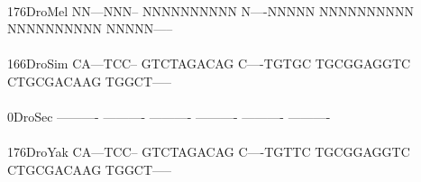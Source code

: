 \documentclass[11pt,twoside,reqno,a4paper]{article}
\begin{document}
{\\
176\hspace*{1\charwidth}DroMel	NN---NNN--	NNNNNNNNNN	N----NNNNN	NNNNNNNNNN	NNNNNNNNNN	NNNNN-----	\\
\hspace*{4\charwidth}\hspace*{7\charwidth}\hspace*{1\charwidth}\hspace*{1\charwidth}\hspace*{1\charwidth}\hspace*{1\charwidth}\hspace*{1\charwidth}\hspace*{1\charwidth}\\
166\hspace*{1\charwidth}DroSim	CA---TCC--	GTCTAGACAG	C----TGTGC	TGCGGAGGTC	CTGCGACAAG	TGGCT-----	\\
\hspace*{4\charwidth}\hspace*{7\charwidth}\hspace*{1\charwidth}\hspace*{1\charwidth}\hspace*{1\charwidth}\hspace*{1\charwidth}\hspace*{1\charwidth}\hspace*{1\charwidth}\\
0\hspace*{3\charwidth}DroSec	----------	----------	----------	----------	----------	----------	\\
\hspace*{4\charwidth}\hspace*{7\charwidth}\hspace*{1\charwidth}\hspace*{1\charwidth}\hspace*{1\charwidth}\hspace*{1\charwidth}\hspace*{1\charwidth}\hspace*{1\charwidth}\\
176\hspace*{1\charwidth}DroYak	CA---TCC--	GTCTAGACAG	C----TGTTC	TGCGGAGGTC	CTGCGACAAG	TGGCT-----	\\
\hspace*{4\charwidth}\hspace*{7\charwidth}\hspace*{1\charwidth}\hspace*{1\charwidth}\hspace*{1\charwidth}\hspace*{1\charwidth}\hspace*{1\charwidth}\hspace*{1\charwidth}\\
}
\end{document}
